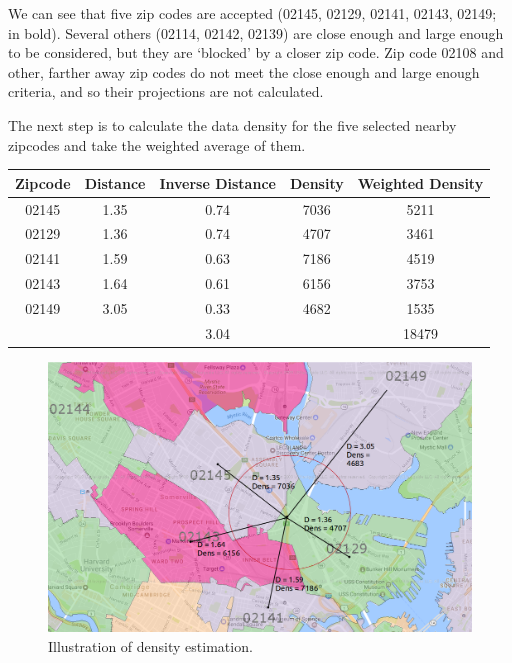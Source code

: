 \documentclass{article}
\begin{document}
We can see that five zip codes are accepted (02145, 02129, 02141, 02143, 02149; in bold). Several others (02114, 02142, 02139) are close enough and large enough to be considered, but they are `blocked' by a closer zip code. Zip code 02108 and other, farther away zip codes do not meet the close enough and large enough criteria, and so their projections are not calculated. 

The next step is to calculate the data density for the five selected nearby zipcodes and take the weighted average of them. 

\begin{center}
\begin{tabular}{ c c c c c }
\hline
Zipcode & Distance & Inverse Distance & Density & Weighted Density \\
\hline
02145 & 1.35 & 0.74 & 7036 & 5211 \\
02129 & 1.36 & 0.74 & 4707 & 3461 \\
02141 & 1.59 & 0.63 & 7186 & 4519 \\
02143 & 1.64 & 0.61 & 6156 & 3753 \\
02149 & 3.05 & 0.33 & 4682 & 1535 \\
\hline
&&3.04&&18479 \\

\end{tabular}
\end{center}

\begin{figure}[H]\label{fig:f2}
\begin{center}\includegraphics[scale=0.6]{Sullivan_for_density_with_markup}\end{center}
\caption{Illustration of density estimation.}\end{figure}
\end{document}

